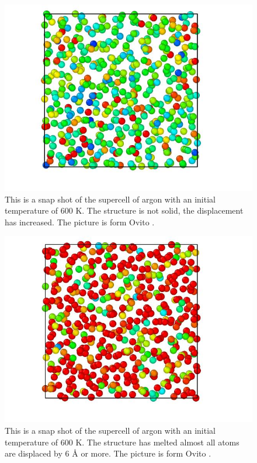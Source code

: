\begin{multicols}{2}
\begin{figure}[H]
\includegraphics[width=\linewidth]{../figures/middle_melted_600}\caption{This is a snap shot of the supercell of argon with an initial temperature of 600 K. The structure is not solid, the displacement has increased. The picture is form Ovito \cite{ovito}.}\label{fig:almost_melted_600K}
\end{figure}

\begin{figure}[H]
\includegraphics[width=\linewidth]{../figures/melted_600}\caption{This is a snap shot of the supercell of argon with an initial temperature of 600 K. The structure has melted almost all atoms are displaced by 6 Å or more. The picture is form Ovito \cite{ovito}.}\label{fig:melted_600K}
\end{figure}

\end{multicols}

